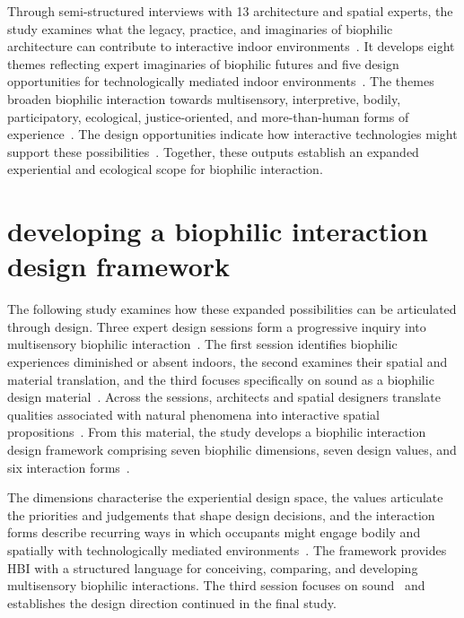 Through semi-structured interviews with 13 architecture and spatial experts, the study examines what the legacy, practice, and imaginaries of biophilic architecture can contribute to interactive indoor environments~\cite{rao2025designing}. It develops eight themes reflecting expert imaginaries of biophilic futures and five design opportunities for technologically mediated indoor environments~\cite{rao2025designing}. The themes broaden biophilic interaction towards multisensory, interpretive, bodily, participatory, ecological, justice-oriented, and more-than-human forms of experience~\cite{rao2025designing,}. The design opportunities indicate how interactive technologies might support these possibilities~\cite{rao2025designing,}. Together, these outputs establish an expanded experiential and ecological scope for biophilic interaction.

\section{developing a biophilic interaction design framework}
The following study examines how these expanded possibilities can be articulated through design. Three expert design sessions form a progressive inquiry into multisensory biophilic interaction~\cite{rao2026biophilic}. The first session identifies biophilic experiences diminished or absent indoors, the second examines their spatial and material translation, and the third focuses specifically on sound as a biophilic design material~\cite{rao2026biophilic}. Across the sessions, architects and spatial designers translate qualities associated with natural phenomena into interactive spatial propositions~\cite{rao2026biophilic}. From this material, the study develops a biophilic interaction design framework comprising seven biophilic dimensions, seven design values, and six interaction forms~\cite{rao2026biophilic}.

The dimensions characterise the experiential design space, the values articulate the priorities and judgements that shape design decisions, and the interaction forms describe recurring ways in which occupants might engage bodily and spatially with technologically mediated environments~\cite{rao2026biophilic}. The framework provides HBI with a structured language for conceiving, comparing, and developing multisensory biophilic interactions. The third session focuses on sound~\cite{rao2026biophilic} and establishes the design direction continued in the final study.


